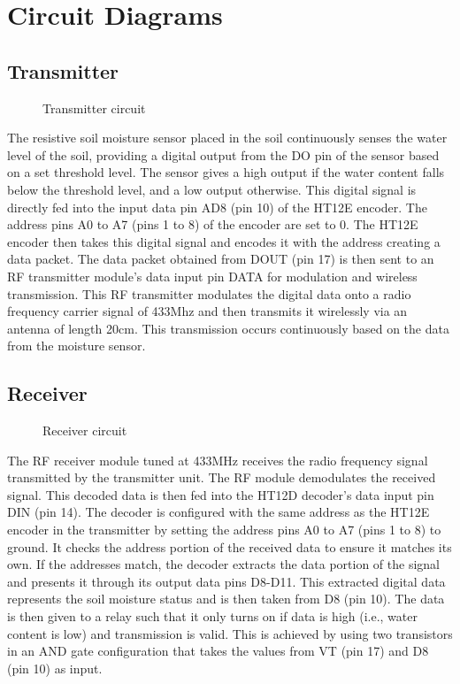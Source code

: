 \section{Circuit Diagrams}

\subsection{Transmitter}
\begin{figure}[ht]
	\centering
	\caption{Transmitter circuit}
\end{figure}

The resistive soil moisture sensor placed in the soil continuously
senses the water level of the soil, providing a digital output from
the DO pin of the sensor based on a set threshold level. The sensor
gives a high output if the water content falls below the threshold
level, and a low output otherwise. This digital signal is directly
fed into the input data pin AD8 (pin 10) of the HT12E encoder. The
address pins A0 to A7 (pins 1 to 8) of the encoder are set to 0. The
HT12E encoder then takes this digital signal and encodes it with the
address creating a data packet. The data packet obtained from DOUT
(pin 17) is then sent to an RF transmitter module's data input pin
DATA for modulation and wireless transmission. This RF transmitter
modulates the digital data onto a radio frequency carrier signal of
433Mhz and then transmits it wirelessly via an antenna of length
20cm. This transmission occurs continuously based on the data from
the moisture sensor.

\subsection{Receiver}
\begin{figure}[ht]
	\centering
	\caption{Receiver circuit}
\end{figure}

The RF receiver module tuned at 433MHz receives the radio frequency
signal transmitted by the transmitter unit. The RF module demodulates
the received signal. This decoded data is then fed into the HT12D
decoder's data input pin DIN (pin 14). The decoder is configured with
the same address as the HT12E encoder in the transmitter by setting
the address pins A0 to A7 (pins 1 to 8) to ground. It checks the
address portion of the received data to ensure it matches its own. If
the addresses match, the decoder extracts the data portion of the
signal and presents it through its output data pins D8-D11. This
extracted digital data represents the soil moisture status and is
then taken from D8 (pin 10). The data is then given to a relay such
that it only turns on if data is high (i.e., water content is low)
and transmission is valid. This is achieved by using two transistors
in an AND gate configuration that takes the values from VT (pin 17)
and D8 (pin 10) as input.

